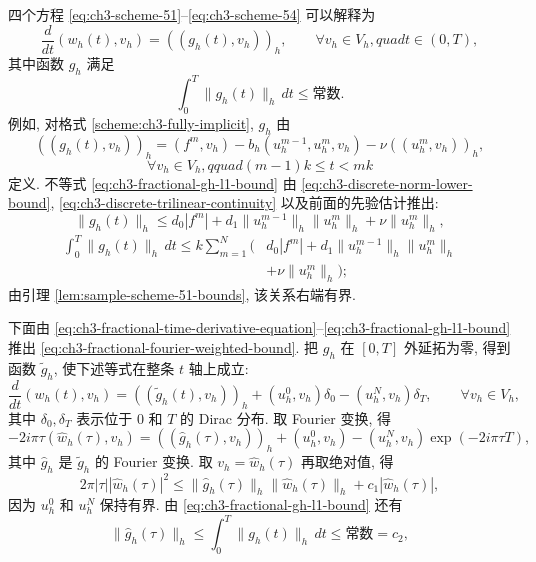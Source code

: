 \begin{Proof}
四个方程 \eqref{eq:ch3-scheme-51}--\eqref{eq:ch3-scheme-54} 可以解释为
\begin{equation}
\frac d{dt}(w_h(t),v_h)=((g_h(t),v_h))_h,
\qquad\forall v_h\in V_h,quad t\in(0,T),
\label{eq:ch3-fractional-time-derivative-equation}
\end{equation}
其中函数 $g_h$ 满足
\begin{equation}
\int_0^T\lVert g_h(t)\rVert_h\,dt\leq\text{常数}.
\label{eq:ch3-fractional-gh-l1-bound}
\end{equation}
例如, 对格式 \ref{scheme:ch3-fully-implicit}, $g_h$ 由
\[
((g_h(t),v_h))_h=(f^m,v_h)-b_h(u_h^{m-1},u_h^m,v_h)
-\nu((u_h^m,v_h))_h,
\]
\[
\forall v_h\in V_h,qquad(m-1)k\leq t<mk
\]
定义. 不等式 \eqref{eq:ch3-fractional-gh-l1-bound} 由 \eqref{eq:ch3-discrete-norm-lower-bound}, \eqref{eq:ch3-discrete-trilinear-continuity} 以及前面的先验估计推出:
\[
\lVert g_h(t)\rVert_h
\leq d_0|f^m|+d_1\lVert u_h^{m-1}\rVert_h\lVert u_h^m\rVert_h
+\nu\lVert u_h^m\rVert_h,
\]
\begin{align*}
\int_0^T\lVert g_h(t)\rVert_h\,dt
\leq k\sum_{m=1}^N\bigl(&d_0|f^m|
+d_1\lVert u_h^{m-1}\rVert_h\lVert u_h^m\rVert_h\\
&+\nu\lVert u_h^m\rVert_h\bigr);
\end{align*}
由引理 \ref{lem:sample-scheme-51-bounds}, 该关系右端有界.

下面由 \eqref{eq:ch3-fractional-time-derivative-equation}--\eqref{eq:ch3-fractional-gh-l1-bound} 推出 \eqref{eq:ch3-fractional-fourier-weighted-bound}. 把 $g_h$ 在 $[0,T]$ 外延拓为零, 得到函数 $\widetilde g_h$, 使下述等式在整条 $t$ 轴上成立:
\begin{equation}
\frac d{dt}(w_h(t),v_h)=((\widetilde g_h(t),v_h))_h
+(u_h^0,v_h)\delta_0-(u_h^N,v_h)\delta_T,
\qquad\forall v_h\in V_h,
\label{eq:ch3-fractional-distribution-equation}
\end{equation}
其中 $\delta_0,\delta_T$ 表示位于 $0$ 和 $T$ 的 Dirac 分布. 取 Fourier 变换, 得
\[
-2i\pi\tau(\widehat w_h(\tau),v_h)
=((\widehat g_h(\tau),v_h))_h+(u_h^0,v_h)
-(u_h^N,v_h)\exp(-2i\pi\tau T),
\]
其中 $\widehat g_h$ 是 $\widetilde g_h$ 的 Fourier 变换. 取 $v_h=\widehat w_h(\tau)$ 再取绝对值, 得
\[
2\pi|\tau||\widehat w_h(\tau)|^2
\leq\lVert\widehat g_h(\tau)\rVert_h
\lVert\widehat w_h(\tau)\rVert_h+c_1|\widehat w_h(\tau)|,
\]
因为 $u_h^0$ 和 $u_h^N$ 保持有界. 由 \eqref{eq:ch3-fractional-gh-l1-bound} 还有
\[
\lVert\widehat g_h(\tau)\rVert_h
\leq\int_0^T\lVert g_h(t)\rVert_h\,dt\leq\text{常数}=c_2,
\]


\end{Proof}
